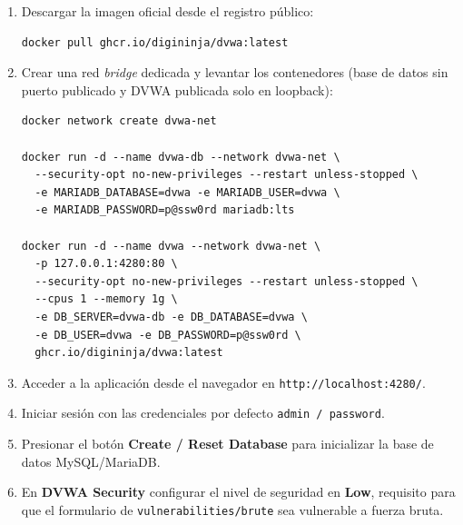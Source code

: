 \documentclass[letter,12pt]{article}
\begin{document}
\begin{enumerate}
    \item Descargar la imagen oficial desde el registro público:
\begin{verbatim}
docker pull ghcr.io/digininja/dvwa:latest
\end{verbatim}
    \item Crear una red \emph{bridge} dedicada y levantar los contenedores (base de datos sin puerto publicado y DVWA publicada solo en loopback):
\begin{verbatim}
docker network create dvwa-net

docker run -d --name dvwa-db --network dvwa-net \
  --security-opt no-new-privileges --restart unless-stopped \
  -e MARIADB_DATABASE=dvwa -e MARIADB_USER=dvwa \
  -e MARIADB_PASSWORD=p@ssw0rd mariadb:lts

docker run -d --name dvwa --network dvwa-net \
  -p 127.0.0.1:4280:80 \
  --security-opt no-new-privileges --restart unless-stopped \
  --cpus 1 --memory 1g \
  -e DB_SERVER=dvwa-db -e DB_DATABASE=dvwa \
  -e DB_USER=dvwa -e DB_PASSWORD=p@ssw0rd \
  ghcr.io/digininja/dvwa:latest
\end{verbatim}
    \item Acceder a la aplicación desde el navegador en \texttt{http://localhost:4280/}.
    \item Iniciar sesión con las credenciales por defecto \texttt{admin / password}.
    \item Presionar el botón \textbf{Create / Reset Database} para inicializar la base de datos MySQL/MariaDB.
    \item En \textbf{DVWA Security} configurar el nivel de seguridad en \textbf{Low}, requisito para que el formulario de \texttt{vulnerabilities/brute} sea vulnerable a fuerza bruta.
\end{enumerate}
\end{document}
